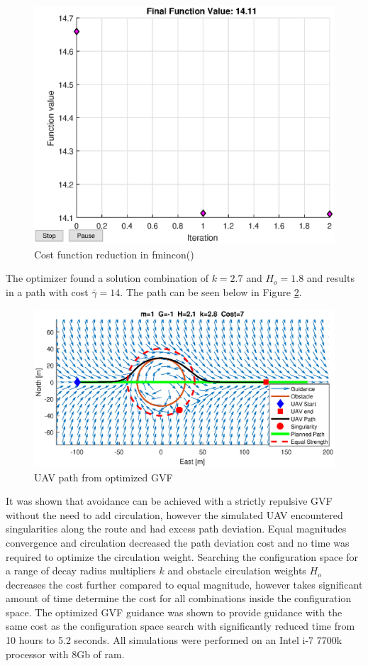 \documentclass[numbered,pdftex]{ohio-etd}
\begin{document}
\begin{figure}[H]
	\centering
	\includegraphics[width=12cm]{PaperFigures/Methods/finalFunctionValue}
	\caption{Cost function reduction in fmincon()}
	\label{fig:finalfunctionvalue}
\end{figure}

The optimizer found a solution combination of $k=2.7$ and $H_o = 1.8$ and results in a path with cost $\bar{\gamma}=14$. The path can be seen below in Figure \ref{fig:optimizedPath}.

\begin{figure}[H]
	\centering
	\includegraphics[trim=0 85 0 85,clip,width=15cm]{PaperFigures/Methods/solvedN1V10}
	\caption{UAV path from optimized GVF}
	\label{fig:optimizedPath}
\end{figure}


It was shown that avoidance can be achieved with a strictly repulsive GVF without the need to add circulation, however the simulated UAV encountered singularities along the route and had excess path deviation. Equal magnitudes convergence and circulation decreased the path deviation cost and no time was required to optimize the circulation weight. Searching the configuration space for a range of decay radius multipliers $k$ and obstacle circulation weights $H_o$ decreases the cost further compared to equal magnitude, however takes significant amount of time determine the cost for all combinations inside the configuration space. The optimized GVF guidance was shown to provide guidance with the same cost as the configuration space search with significantly reduced time from 10 hours to 5.2 seconds. All simulations were performed on an Intel i-7 7700k processor with 8Gb of ram. \\
\end{document}
